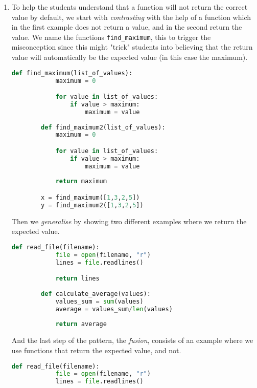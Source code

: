 \begin{enumerate}
    \item To help the students understand that a function will not return 
the correct value by default, we start with \emph{contrasting} with the 
help of a function which in the first example does not return a value, 
and in the second return the value. We name the functions \texttt{find_maximum}, this to trigger the misconception since this 
might "trick" students into believing that the return value will 
automatically be the expected value (in this case the maximum). 
    
     \begin{lstlisting}[language=Python]
        def find_maximum(list_of_values):
            maximum = 0

            for value in list_of_values:
                if value > maximum:
                    maximum = value
            
        def find_maximum2(list_of_values):
            maximum = 0

            for value in list_of_values:
                if value > maximum:
                    maximum = value
                    
            return maximum

        x = find_maximum([1,3,2,5])
        y = find_maximum2([1,3,2,5])
    \end{lstlisting}

    Then we \emph{generalise} by showing two different examples where we 
return the expected value. 

    \begin{lstlisting}[language=Python]
        def read_file(filename):
            file = open(filename, "r")
            lines = file.readlines()

            return lines
            
        def calculate_average(values):
            values_sum = sum(values)
            average = values_sum/len(values)
     
            return average
    \end{lstlisting}

    And the last step of the pattern, the \emph{fusion}, consists of an 
example where we use functions that return the expected value, and not.

    \begin{lstlisting}[language=Python]
        def read_file(filename):
            file = open(filename, "r")
            lines = file.readlines()


\end{lstlisting}
\end{enumerate}
